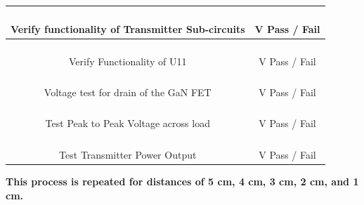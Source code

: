 \documentclass[12pt]{article}
\begin{document}
\begin{table}[h!]
\begin{tabular}{ | c | c | }
\hline
\parbox{0.5\linewidth}{\raggedright \hfill \\[-0.25 em]
Verify functionality of Transmitter Sub-circuits \hfill \\[0.1 em]
} &  \parbox{0.4\linewidth}{\raggedright \hfill \\ [0.7 em]
\underline{\hspace{0.625in}} V  \hspace{0.125 in}Pass \space / \space  Fail \hfill \\ [0.3 em]
} \\ 
\hline
\parbox{0.5\linewidth}{\raggedright \hfill \\[-0.25 em]
Verify Functionality of U11 \hfill \\[0.1 em]
} &  \parbox{0.4\linewidth}{\raggedright \hfill \\ [0.7 em]
\underline{\hspace{0.625in}} V  \hspace{0.125 in}Pass \space / \space  Fail \hfill \\ [0.3 em]
} \\ 
\hline
\parbox{0.5\linewidth}{\raggedright \hfill \\[-0.25 em]
Voltage test for drain of the GaN FET \hfill \\[0.1 em]
} &  \parbox{0.4\linewidth}{\raggedright \hfill \\ [0.7 em]
\underline{\hspace{0.625in}} V  \hspace{0.125 in}Pass \space / \space  Fail \hfill \\ [0.3 em]
} \\ 
\hline
\parbox{0.5\linewidth}{\raggedright \hfill \\[-0.25 em]
Test Peak to Peak Voltage across load \hfill \\[0.1 em]
} &  \parbox{0.4\linewidth}{\raggedright \hfill \\ [0.7 em]
\underline{\hspace{0.625in}} V  \hspace{0.125 in}Pass \space / \space  Fail \hfill \\ [0.3 em]
} \\ 
\hline
\parbox{0.5\linewidth}{\raggedright \hfill \\[-0.25 em]
Test Transmitter Power Output \hfill \\[0.1 em]
} &  \parbox{0.4\linewidth}{\raggedright \hfill \\ [0.7 em]
\underline{\hspace{0.625in}} V  \hspace{0.125 in}Pass \space / \space  Fail \hfill \\ [0.3 em]
} \\ 
\hline
\end{tabular}
\end{table}
\noindent
\textbf{This process is repeated for distances of 5 cm, 4 cm, 3 cm, 2 cm, and 1 cm.}
\end{document}
